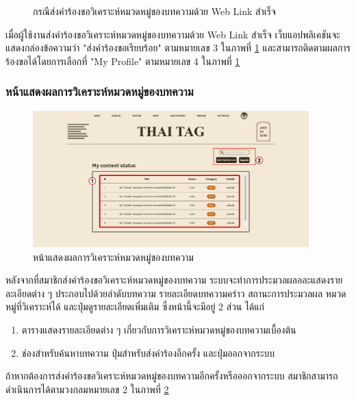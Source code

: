 \documentclass[12pt,oneside,openright,a4paper]{cpe-thai-project}
\begin{document}
\begin{itemize}
\begin{figure}[!ht]
            \caption{กรณีส่งคำร้องขอวิเคราะห์หมวดหมู่ของบทความด้วย Web Link สำเร็จ}\label{fig:exp_weblink_succcess}
          \end{figure}
          \hspace{1cm}เมื่อผู้ใช้งานส่งคำร้องขอวิเคราะห์หมวดหมู่ของบทความด้วย Web Link สำเร็จ 
          เว็บแอปพลิเคชันจะแสดงกล่องข้อความว่า "ส่งคำร้องขอเรียบร้อย" ตามหมายเลข 3 ในภาพที่ \ref{fig:exp_weblink_succcess}
          และสามารถติดตามผลการร้องขอได้โดยการเลือกที่ "My Profile" ตามหมายเลข 4 ในภาพที่ \ref{fig:exp_weblink_succcess} 

        \subsubsection{หน้าแสดงผลการวิเคราะห์หมวดหมู่ของบทความ}
          \begin{figure}[!ht]\centering
            \includegraphics[width=0.95\textwidth]{./img/project_ui/4_7.png}
            \caption{หน้าแสดงผลการวิเคราะห์หมวดหมู่ของบทความ}\label{fig:exp_result}
          \end{figure}
          \hspace{1cm}หลังจากที่สมาชิกส่งคำร้องขอวิเคราะห์หมวดหมู่ของบทความ ระบบจะทำการประมวลผลอละแสดงรายละเอียดต่าง ๆ 
          ประกอบไปด้วยลำดับบทความ รายละเอียดบทความคร่าว สถานะการประมวลผล หมวดหมู่ที่วิเคราะห์ได้ และปุ่มดูรายละเอียดเพิ่มเติม 
          ซึ่งหน้านี้จะมีอยู่ 2 ส่วน ได้แก่
          \begin{enumerate}
            \item ตารางแสดงรายละเอียดต่าง ๆ เกี่ยวกับการวิเคราะห์หมวดหมู่ของบทความเบื้องต้น
            \item ช่องสำหรับค้นหาบทความ ปุ่มสำหรับส่งคำร้องอีกครั้ง และปุ่มออกจากระบบ
          \end{enumerate}
          \hspace{1cm}ถ้าหากต้องการส่งคำร้องขอวิเคราะห์หมวดหมู่ของบทความอีกครั้งหรือออกจากระบบ สมาชิกสามารถดำเนินการได้ตามวงกลมหมายเลข 2 
          ในภาพที่ \ref{fig:exp_result} 


\end{itemize}
\end{document}
